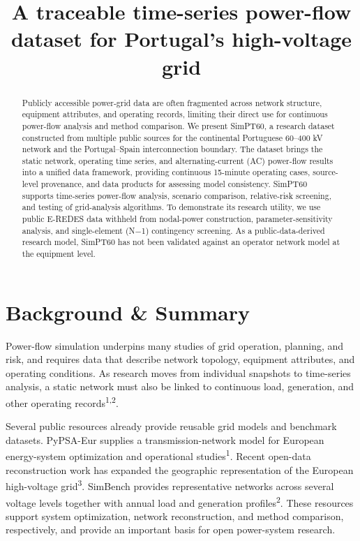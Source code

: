 \documentclass[
  10pt]{article}
\title{A traceable time-series power-flow dataset for Portugal's
high-voltage grid}
\author{}
\date{}
\begin{document}
\maketitle
\begin{abstract}
Publicly accessible power-grid data are often fragmented across network
structure, equipment attributes, and operating records, limiting their
direct use for continuous power-flow analysis and method comparison. We
present SimPT60, a research dataset constructed from multiple public
sources for the continental Portuguese 60--400 kV network and the
Portugal--Spain interconnection boundary. The dataset brings the static
network, operating time series, and alternating-current (AC) power-flow
results into a unified data framework, providing continuous 15-minute
operating cases, source-level provenance, and data products for
assessing model consistency. SimPT60 supports time-series power-flow
analysis, scenario comparison, relative-risk screening, and testing of
grid-analysis algorithms. To demonstrate its research utility, we use
public E-REDES data withheld from nodal-power construction,
parameter-sensitivity analysis, and single-element (N−1) contingency
screening. As a public-data-derived research model, SimPT60 has not been
validated against an operator network model at the equipment level.
\end{abstract}

\section{Background \& Summary}\label{background-summary}

Power-flow simulation underpins many studies of grid operation,
planning, and risk, and requires data that describe network topology,
equipment attributes, and operating conditions. As research moves from
individual snapshots to time-series analysis, a static network must also
be linked to continuous load, generation, and other operating
records\textsuperscript{1,2}.

Several public resources already provide reusable grid models and
benchmark datasets. PyPSA-Eur supplies a transmission-network model for
European energy-system optimization and operational
studies\textsuperscript{1}. Recent open-data reconstruction work has
expanded the geographic representation of the European high-voltage
grid\textsuperscript{3}. SimBench provides representative networks
across several voltage levels together with annual load and generation
profiles\textsuperscript{2}. These resources support system
optimization, network reconstruction, and method comparison,
respectively, and provide an important basis for open power-system
research.
\end{document}
